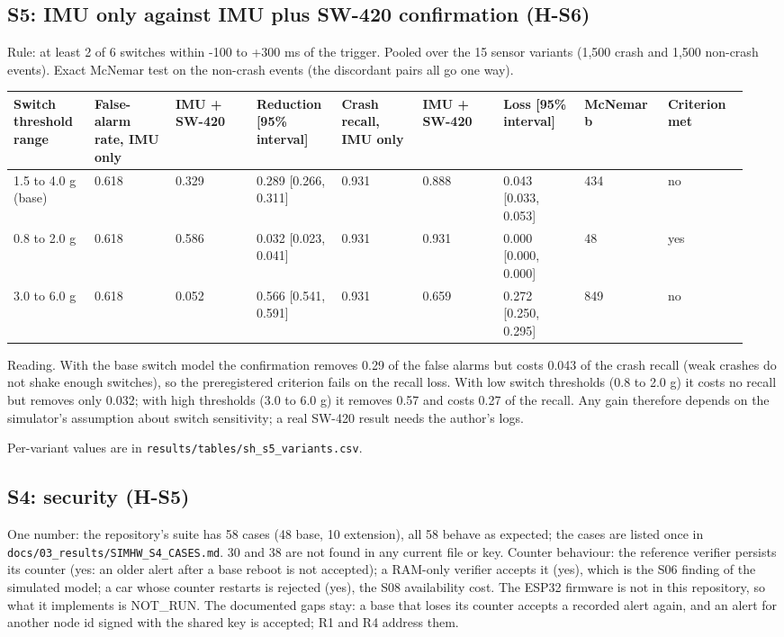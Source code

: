 \subsection*{S5: IMU only against IMU plus SW-420 confirmation (H-S6)}

Rule: at least 2 of 6 switches within -100 to +300 ms of the trigger. Pooled over the 15 sensor variants (1,500 crash and 1,500 non-crash events). Exact McNemar test on the non-crash events (the discordant pairs all go one way).

{\scriptsize\raggedright
\begin{longtable}{p{0.106\linewidth}p{0.106\linewidth}p{0.106\linewidth}p{0.106\linewidth}p{0.106\linewidth}p{0.106\linewidth}p{0.106\linewidth}p{0.106\linewidth}p{0.106\linewidth}}
\toprule
Switch threshold range & False-alarm rate, IMU only & IMU + SW-420 & Reduction [95\% interval] & Crash recall, IMU only & IMU + SW-420 & Loss [95\% interval] & McNemar b & Criterion met \\
\midrule
\endhead
1.5 to 4.0 g (base) & 0.618 & 0.329 & 0.289 [0.266, 0.311] & 0.931 & 0.888 & 0.043 [0.033, 0.053] & 434 & no \\
0.8 to 2.0 g & 0.618 & 0.586 & 0.032 [0.023, 0.041] & 0.931 & 0.931 & 0.000 [0.000, 0.000] & 48 & yes \\
3.0 to 6.0 g & 0.618 & 0.052 & 0.566 [0.541, 0.591] & 0.931 & 0.659 & 0.272 [0.250, 0.295] & 849 & no \\
\bottomrule
\end{longtable}}

Reading. With the base switch model the confirmation removes 0.29 of the false alarms but costs 0.043 of the crash recall (weak crashes do not shake enough switches), so the preregistered criterion fails on the recall loss. With low switch thresholds (0.8 to 2.0 g) it costs no recall but removes only 0.032; with high thresholds (3.0 to 6.0 g) it removes 0.57 and costs 0.27 of the recall. Any gain therefore depends on the simulator's assumption about switch sensitivity; a real SW-420 result needs the author's logs.

Per-variant values are in \texttt{results/tables/sh\_s5\_variants.csv}.

\subsection*{S4: security (H-S5)}

One number: the repository's suite has 58 cases (48 base, 10 extension), all 58 behave as expected; the cases are listed once in \texttt{docs/03\_results/SIMHW\_S4\_CASES.md}. 30 and 38 are not found in any current file or key. Counter behaviour: the reference verifier persists its counter (yes: an older alert after a base reboot is not accepted); a RAM-only verifier accepts it (yes), which is the S06 finding of the simulated model; a car whose counter restarts is rejected (yes), the S08 availability cost. The ESP32 firmware is not in this repository, so what it implements is NOT\_RUN. The documented gaps stay: a base that loses its counter accepts a recorded alert again, and an alert for another node id signed with the shared key is accepted; R1 and R4 address them.

